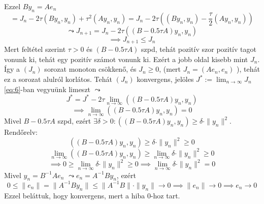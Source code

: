 Ezzel $By_{n} = Ae_{n}$
\begin{equation*}
    = J_{n} - 2\tau(By_{n}, y_{n}) + \tau ^{2} (Ay_{n}, y_{n}) = J_{n} - 2\tau \left( (By_{n}, y_{n}) - \frac{\tau}{2}(Ay_{n}, y_{n}) \right)
\end{equation*}
\begin{equation}\label{eq:6}
    \leadsto J_{n+1} = J_{n} - 2\tau((B - 0.5\tau A)y_{n}, y_{n})
\end{equation}
\begin{equation*}
    \implies J_{n+1} \leq J_{n}
\end{equation*}
Mert feltétel szerint $\tau > 0$ és $(B - 0.5 \tau A)$ szpd, tehát pozitív szor pozitív tagot vonunk ki, tehát egy pozitív számot vonunk ki. Ezért a jobb oldal kisebb mint $J_{n}$.
Így a $(J_{n})$ sorozat monoton csökkenő, és $J_{n} \geq 0$, (mert $J_{n} = (Ae_{n}, e_{n})$ ), tehát ez a sorozat alulról korlátos.
Tehát $(J_{n})$ konvergens, jelöles $J^{*} := \lim_{ n \to \infty }J_{n}$ \\
\ref{eq:6}-ban vegyuünk limeszt $\leadsto$
\begin{equation*}
    J^{*} = J^{*} - 2\tau \lim_{ n \to \infty } ((B - 0.5 \tau A)y_{n}, y_{n})
\end{equation*}
\begin{equation*}
    \implies \lim_{ n \to \infty } ((B - 0.5 \tau A)y_{n}, y_{n}) = 0
\end{equation*}
Mivel $B - 0.5\tau A$ szpd, ezért $\exists \delta > 0: ((B - 0.5 \tau A)y_{n}, y_{n}) \geq \delta \cdot \| y_{n} \|^{2}$.
Rendőrelv:
\begin{equation*}
    ((B - 0.5 \tau A)y_{n}, y_{n}) \geq \delta \cdot \| y_{n} \|^{2} \geq 0
\end{equation*}
\begin{equation*}
    \lim_{ n \to \infty } ((B - 0.5 \tau A)y_{n}, y_{n}) \geq \lim_{ n \to \infty }  \delta \cdot \| y_{n} \|^{2} \geq 0
\end{equation*}
\begin{equation*}
    \implies 0 \geq \lim_{ n \to \infty } \delta \cdot \| y_{n} \| ^{2} \geq 0 \implies \lim_{ n \to \infty } \delta \cdot \| y_{n} \| ^{2} = 0
\end{equation*}
Mivel $y_{n} = B^{-1}Ae_{n}$ $\leadsto e_{n} = A^{-1}By_{n}$, ezért
\begin{equation*}
    0 \leq \| e_{n} \| = \| A^{-1}By_{n} \| \leq \| A^{-1}B \|  \cdot \| y_{n} \| \to 0 \implies \| e_{n} \| \to 0 \implies e_{n} \to 0
\end{equation*}
Ezzel beláttuk, hogy konvergens, mert a hiba $0$-hoz tart.

